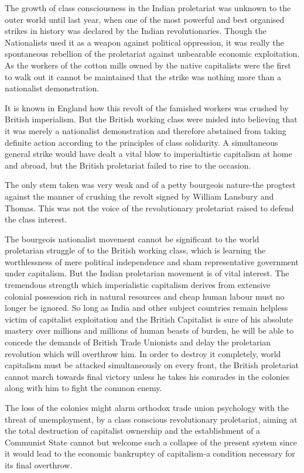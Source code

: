 The growth of class consciousness in the Indian proletariat was unknown to the outer world until last year, when one of the most powerful and best organised strikes in history was declared by the Indian revolutionaries. Though the Nationalists used it as a weapon against political oppression, it was really the spontaneous rebellion of the proletariat against unbearable economic exploitation. As the workers of the cotton mills owned by the native capitalists were the first to walk out it cannot be maintained that the strike was nothing more than a nationalist demonstration. 

It is known in England how this revolt of the famished workers was crushed by British imperialism. But the British working class were misled into believing that it was merely a nationalist demonstration and therefore abstained from taking definite action according to the principles of class solidarity. A simultaneous general strike would have dealt a vital blow to imperialtistic capitalism at home and abroad, but the British proletariat failed to rise to the occasion. 

The only stem taken was very weak and of a petty bourgeois nature-the progtest against the manner of crushing the revolt signed by William Lansbury and Thomas. This was not the voice of the revolutionary proletariat raised to defend the class interest.

The bourgeois nationalist movement cannot be significant to the world proletarian struggle of to the British working class, which is learning the worthlessness of mere political independence and sham representative government under capitalism. But the Indian proletarian movement is of vital interest. The tremendous strength which imperialistic capitalism derives from extensive colonial possession rich in natural resources and cheap human labour must no longer be ignored. So long as India and other subject countries remain helpless victim of capitalist exploitation and the British Capitalist is sure of his absolute mastery over millions and millions of human beasts of burden, he will be able to concede the demands of British Trade Unionists and delay the proletarian revolution which will overthrow him. In order to destroy it completely, world capitalism must be attacked simultaneously on every front, the British proletariat cannot march towards final victory unless he takes his comrades in the colonies along with him to fight the common enemy. 

The loss of the colonies might alarm orthodox trade union psychology with the threat of unemployment, by a class conscious revolutionary proletariat, aiming at the total destruction of capitalist ownership and the establishment of a Communist State cannot but welcome such a collapse of the present system since it would lead to the economic bankruptcy of capitalism-a condition necessary for its final overthrow. 


